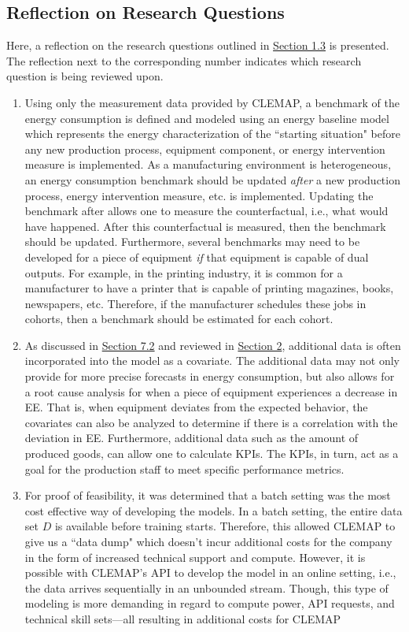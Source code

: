 \subsection{Reflection on Research Questions}

Here, a reflection on the research questions outlined in \hyperlink{subsection.1.3}{Section 1.3} is presented. The reflection next to the corresponding number indicates which research question is being reviewed upon.

\begin{enumerate}
    \item Using only the measurement data provided by CLEMAP, a benchmark of the energy consumption is defined and modeled using an energy baseline model which represents the energy characterization of the ``starting situation" before any new production process, equipment component, or energy intervention measure is implemented. As a manufacturing environment is heterogeneous, an energy consumption benchmark should be updated \textit{after} a new production process, energy intervention measure, etc. is implemented. Updating the benchmark after allows one to measure the counterfactual, i.e., what would have happened. After this counterfactual is measured, then the benchmark should be updated. Furthermore, several benchmarks may need to be developed for a piece of equipment \textit{if} that equipment is capable of dual outputs. For example, in the printing industry, it is common for a manufacturer to have a printer that is capable of printing magazines, books, newspapers, etc. Therefore, if the manufacturer schedules these jobs in cohorts, then a benchmark should be estimated for each cohort.
    
    \item As discussed in \hyperlink{subsection.7.2}{Section 7.2} and reviewed in \hyperlink{section.2}{Section 2}, additional data is often incorporated into the model as a covariate. The additional data may not only provide for more precise forecasts in energy consumption, but also allows for a root cause analysis for when a piece of equipment experiences a decrease in EE. That is, when equipment deviates from the expected behavior, the covariates can also be analyzed to determine if there is a correlation with the deviation in EE. Furthermore, additional data such as the amount of produced goods, can allow one to calculate KPIs. The KPIs, in turn, act as a goal for the production staff to meet specific performance metrics. 
    
    \item For proof of feasibility, it was determined that a batch setting was the most cost effective way of developing the models. In a batch setting, the entire data set $D$ is available before training starts. Therefore, this allowed CLEMAP to give us a ``data dump" which doesn't incur additional costs for the company in the form of increased technical support and compute. However, it is possible with CLEMAP's \ac{API} to develop the model in an online setting, i.e., the data arrives sequentially in an unbounded stream. Though, this type of modeling is more demanding in regard to compute power, API requests, and technical skill sets—all resulting in additional costs for CLEMAP
    

\end{enumerate}
